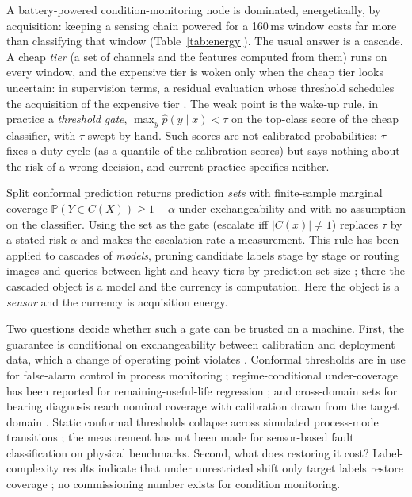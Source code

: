 \documentclass{ifacconf}
\begin{document}
A battery-powered condition-monitoring node is dominated, energetically, by acquisition: keeping a sensing chain powered for a 160\,ms window costs far more than classifying that window (Table~\ref{tab:energy}). The usual answer is a cascade. A cheap \emph{tier} (a set of channels and the features computed from them) runs on every window, and the expensive tier is woken only when the cheap tier looks uncertain: in supervision terms, a residual evaluation whose threshold schedules the acquisition of the expensive tier \citep{isermann2006}. The weak point is the wake-up rule, in practice a \emph{threshold gate}, $\max_y \hat p(y\mid x)<\tau$ on the top-class score of the cheap classifier, with $\tau$ swept by hand. Such scores are not calibrated probabilities: $\tau$ fixes a duty cycle (as a quantile of the calibration scores) but says nothing about the risk of a wrong decision, and current practice specifies neither.

Split conformal prediction \citep{vovk2005} returns prediction \emph{sets} with finite-sample marginal coverage $\mathbb P(Y\in C(X))\ge 1-\alpha$ under exchangeability and with no assumption on the classifier. Using the set as the gate (escalate iff $|C(x)|\ne 1$) replaces $\tau$ by a stated risk $\alpha$ and makes the escalation rate a measurement. This rule has been applied to cascades of \emph{models}, pruning candidate labels stage by stage \citep{fisch2021cascades} or routing images and queries between light and heavy tiers by prediction-set size \citep{turkoglu2026cads,dou2026conformalcascade}; there the cascaded object is a model and the currency is computation. Here the object is a \emph{sensor} and the currency is acquisition energy.

Two questions decide whether such a gate can be trusted on a machine. First, the guarantee is conditional on exchangeability between calibration and deployment data, which a change of operating point violates \citep{tibshirani2019covariate,barber2023beyond}. Conformal thresholds are in use for false-alarm control in process monitoring \citep{diallo2025falsealarms}; regime-conditional under-coverage has been reported for remaining-useful-life regression \citep{wang2026rulregime}; and cross-domain sets for bearing diagnosis reach nominal coverage with calibration drawn from the target domain \citep{mei2025calibratedset}. Static conformal thresholds collapse across simulated process-mode transitions \citep{heddoub2026online}; the measurement has not been made for sensor-based fault classification on physical benchmarks. Second, what does restoring it cost? Label-complexity results indicate that under unrestricted shift only target labels restore coverage \citep{han2026labelcomplexity}; no commissioning number exists for condition monitoring.
\end{document}
